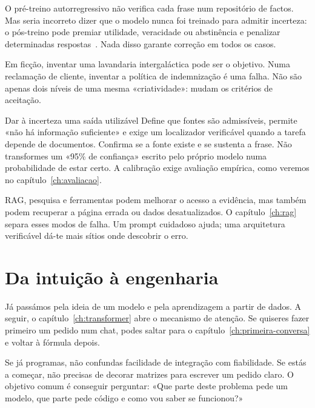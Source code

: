 O pré-treino autorregressivo não verifica cada frase num repositório de factos. Mas seria incorreto dizer que o modelo nunca foi treinado para admitir incerteza: o pós-treino pode premiar utilidade, veracidade ou abstinência e penalizar determinadas respostas~\citep{ouyang2022}. Nada disso garante correção em todos os casos.

Em ficção, inventar uma lavandaria intergaláctica pode ser o objetivo. Numa reclamação de cliente, inventar a política de indemnização é uma falha. Não são apenas dois níveis de uma mesma «criatividade»: mudam os critérios de aceitação.

\begin{checklistbox}{Dar à incerteza uma saída utilizável}
Define que fontes são admissíveis, permite «não há informação suficiente» e exige um localizador verificável quando a tarefa depende de documentos. Confirma se a fonte existe e se sustenta a frase. Não transformes um «95\% de confiança» escrito pelo próprio modelo numa probabilidade de estar certo. A calibração exige avaliação empírica, como veremos no capítulo~\ref{ch:avaliacao}.
\end{checklistbox}

RAG, pesquisa e ferramentas podem melhorar o acesso a evidência, mas também podem recuperar a página errada ou dados desatualizados. O capítulo~\ref{ch:rag} separa esses modos de falha. Um prompt cuidadoso ajuda; uma arquitetura verificável dá-te mais sítios onde descobrir o erro.


\section{Da intuição à engenharia}
Já passámos pela ideia de um modelo e pela aprendizagem a partir de dados. A seguir, o capítulo~\ref{ch:transformer} abre o mecanismo de atenção. Se quiseres fazer primeiro um pedido num chat, podes saltar para o capítulo~\ref{ch:primeira-conversa} e voltar à fórmula depois.

Se já programas, não confundas facilidade de integração com fiabilidade. Se estás a começar, não precisas de decorar matrizes para escrever um pedido claro. O objetivo comum é conseguir perguntar: «Que parte deste problema pede um modelo, que parte pede código e como vou saber se funcionou?»

